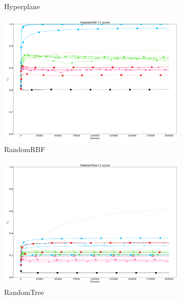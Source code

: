 \begin{figure}[ht]
\begin{subfigure}[t]{.5\linewidth}
		\caption{Hyperplane}
		\label{fig:f1-dataset_1}
	\end{subfigure}
	\begin{subfigure}[t]{.5\linewidth}
		\includegraphics[width=\linewidth]{figures/results/dataset_2_f1.png}
		\caption{RandomRBF}
		\label{fig:f1-dataset_2}
	\end{subfigure}
	\begin{subfigure}[t]{.5\linewidth}
		\includegraphics[width=\linewidth]{figures/results/dataset_3_f1.png}
		\caption{RandomTree}
		\label{fig:f1-dataset_3}
	\end{subfigure}
	\begin{subfigure}[t]{.5\linewidth}

\end{subfigure}
\end{figure}
